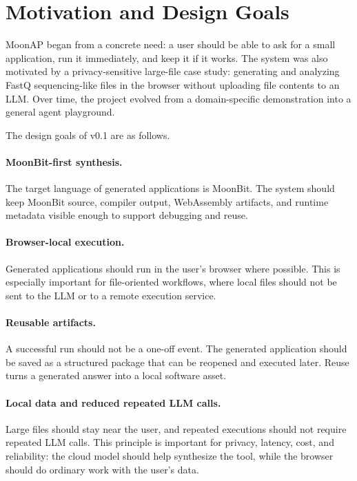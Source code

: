 \documentclass[11pt]{article}
\newcommand{\moonap}{MoonAP}
\newcommand{\wasm}{WebAssembly}
\begin{document}
\section{Motivation and Design Goals}

\moonap{} began from a concrete need: a user should be able to ask for a small application, run it immediately, and keep it if it works. The system was also motivated by a privacy-sensitive large-file case study: generating and analyzing FastQ sequencing-like files in the browser without uploading file contents to an LLM. Over time, the project evolved from a domain-specific demonstration into a general agent playground.

The design goals of v0.1 are as follows.

\paragraph{MoonBit-first synthesis.}
The target language of generated applications is MoonBit. The system should keep MoonBit source, compiler output, \wasm{} artifacts, and runtime metadata visible enough to support debugging and reuse.

\paragraph{Browser-local execution.}
Generated applications should run in the user's browser where possible. This is especially important for file-oriented workflows, where local files should not be sent to the LLM or to a remote execution service.

\paragraph{Reusable artifacts.}
A successful run should not be a one-off event. The generated application should be saved as a structured package that can be reopened and executed later. Reuse turns a generated answer into a local software asset.

\paragraph{Local data and reduced repeated LLM calls.}
Large files should stay near the user, and repeated executions should not require repeated LLM calls. This principle is important for privacy, latency, cost, and reliability: the cloud model should help synthesize the tool, while the browser should do ordinary work with the user's data.
\end{document}

